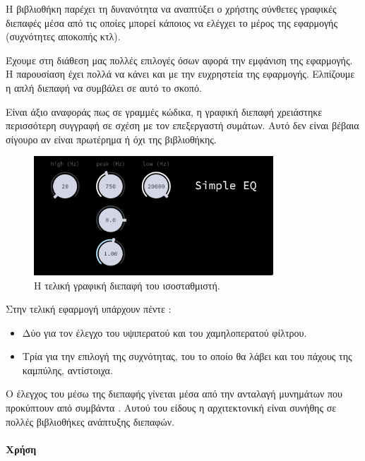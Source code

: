 \documentclass[12pt]{extarticle}
\begin{document}
Η βιβλιοθήκη  παρέχει τη δυνανότητα να αναπτύξει ο χρήστης 
σύνθετες γραφικές διεπαφές μέσα από τις οποίες μπορεί κάποιος να ελέγχει 
το  μέρος της εφαρμογής (συχνότητες αποκοπής κτλ).

Έχουμε στη διάθεση μας πολλές επιλογές όσων αφορά την εμφάνιση της εφαρμογής. 
Η παρουσίαση έχει πολλά να κάνει και με την ευχρηστεία της εφαρμογής. 
Ελπίζουμε η απλή διεπαφή να συμβάλει σε αυτό το σκοπό. 

Είναι άξιο αναφοράς πως σε γραμμές κώδικα, η γραφική διεπαφή χρειάστηκε 
περισσότερη συγγραφή σε σχέση με τον επεξεργαστή συμάτων. 
Αυτό δεν είναι βέβαια σίγουρο αν είναι πρωτέρημα ή όχι της βιβλιοθήκης.

\begin{figure}[htpb]
    \centering
    \includegraphics[width=0.8\textwidth]{./assets/GUI.png}
    \caption{Η τελική γραφική διεπαφή του ισοσταθμιστή.}
    \label{fig:finalgui}
\end{figure}

Στην τελική εφαρμογή υπάρχουν πέντε :

\begin{itemize}
    \item Δύο για τον έλεγχο του υψιπερατού και του χαμηλοπερατού φίλτρου.
    \item Τρία για την επιλογή της  συχνότητας, του  το οποίο θα λάβει και του πάχους της καμπύλης, αντίστοιχα.
\end{itemize}

Ο έλεγχος του  μέσω της διεπαφής γίνεται μέσα από την ανταλαγή μυνημάτων 
που προκύπτουν από συμβάντα  \cite{EventsArchWiki}. Αυτού του είδους η αρχιτεκτονική 
είναι συνήθης σε πολλές βιβλιοθήκες ανάπτυξης διεπαφών.

\paragraph{Χρήση}

\subsection{}
\end{document}
